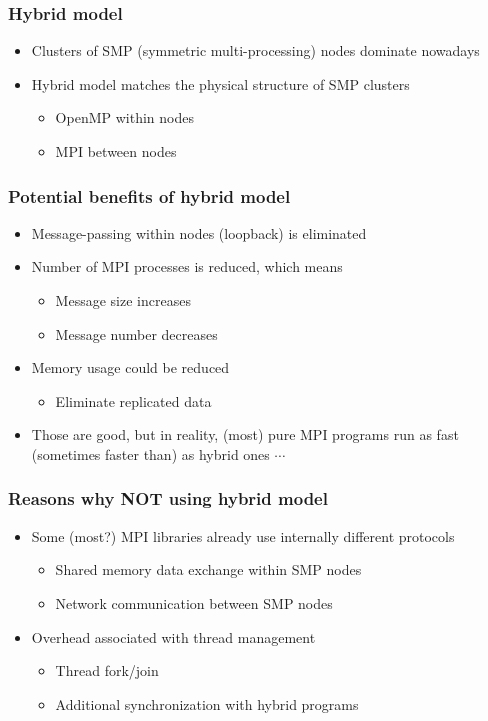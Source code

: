 \documentclass[10pt,t]{beamer}
\begin{document}
\begin{frame}
\frametitle{Hybrid model}
\begin{itemize}
\item Clusters of SMP (symmetric multi-processing) nodes dominate nowadays
\item Hybrid model matches the physical structure of SMP clusters
\begin{itemize}
\item OpenMP within nodes
\item MPI between nodes
\end{itemize}

\end{itemize}
\end{frame}

\begin{frame}
\frametitle{Potential benefits of hybrid model}
\begin{itemize}
\item Message-passing within nodes (loopback) is eliminated
\item Number of MPI processes is reduced, which means
\begin{itemize}
\item Message size increases
\item Message number decreases
\end{itemize}
\item Memory usage could be reduced
\begin{itemize}
\item Eliminate replicated data
\end{itemize}
\item Those are good, but in reality, (most) pure MPI programs run as fast (sometimes faster than) as hybrid
ones $\cdots$
\end{itemize}
\end{frame}

\begin{frame}
\frametitle{Reasons why NOT using hybrid model}
\begin{itemize}
\item Some (most?) MPI libraries already use internally different protocols
\begin{itemize}
\item Shared memory data exchange within SMP nodes
\item Network communication between SMP nodes
\end{itemize}
\item Overhead associated with thread management
\begin{itemize}
\item Thread fork/join
\item Additional synchronization with hybrid programs 
\end{itemize}
\end{itemize}
\end{frame}
\end{document}
